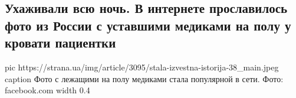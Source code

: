 
 
 
 
 
 
\subsection{Ухаживали всю ночь. В интернете прославилось фото из России с уставшими медиками на полу у кровати пациентки}
\label{sec:30_12_2020.news.ua.strana.1.uhazhivali_vsu_noch_mediki}


\ifcmt
  pic https://strana.ua/img/article/3095/stala-izvestna-istorija-38_main.jpeg
	caption Фото с лежащими на полу медиками стала популярной в сети. Фото: facebook.com
  width 0.4
\fi

